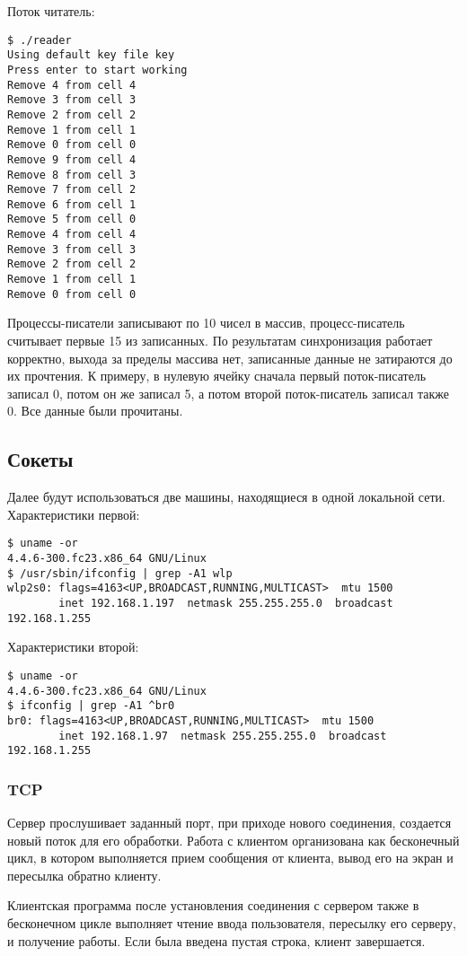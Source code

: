 \documentclass[a4paper]{article}
\begin{document}
	Поток читатель:
	\begin{lstlisting}[style=crs_bash]
$ ./reader 
Using default key file key
Press enter to start working
Remove 4 from cell 4
Remove 3 from cell 3
Remove 2 from cell 2
Remove 1 from cell 1
Remove 0 from cell 0
Remove 9 from cell 4
Remove 8 from cell 3
Remove 7 from cell 2
Remove 6 from cell 1
Remove 5 from cell 0
Remove 4 from cell 4
Remove 3 from cell 3
Remove 2 from cell 2
Remove 1 from cell 1
Remove 0 from cell 0
	\end{lstlisting}
	
	Процессы-писатели записывают по 10 чисел в массив, процесс-писатель считывает первые 15 из записанных. По результатам синхронизация работает корректно, выхода за пределы массива нет, записанные данные не затираются до их прочтения. К примеру, в нулевую ячейку сначала первый поток-писатель записал 0, потом он же записал 5, а потом второй поток-писатель записал также 0. Все данные были прочитаны.

\subsection{Сокеты}
	Далее будут использоваться две машины, находящиеся в одной локальной сети.
	Характеристики первой:
	\begin{lstlisting}[style=crs_bash]
$ uname -or
4.4.6-300.fc23.x86_64 GNU/Linux
$ /usr/sbin/ifconfig | grep -A1 wlp
wlp2s0: flags=4163<UP,BROADCAST,RUNNING,MULTICAST>  mtu 1500
        inet 192.168.1.197  netmask 255.255.255.0  broadcast 192.168.1.255
    \end{lstlisting}
	
	Характеристики второй:
	\begin{lstlisting}[style=crs_bash]
$ uname -or
4.4.6-300.fc23.x86_64 GNU/Linux
$ ifconfig | grep -A1 ^br0
br0: flags=4163<UP,BROADCAST,RUNNING,MULTICAST>  mtu 1500
        inet 192.168.1.97  netmask 255.255.255.0  broadcast 192.168.1.255
    \end{lstlisting}
\subsubsection{TCP}	
	Сервер прослушивает заданный порт, при приходе нового соединения, создается новый поток для его обработки. Работа с клиентом организована как бесконечный цикл, в котором выполняется прием сообщения от клиента, вывод его на экран и пересылка обратно клиенту.
	
	Клиентская программа после установления соединения с сервером также в бесконечном цикле выполняет чтение ввода пользователя, пересылку его серверу, и получение работы. Если была введена пустая строка, клиент завершается.
	
\end{document}

